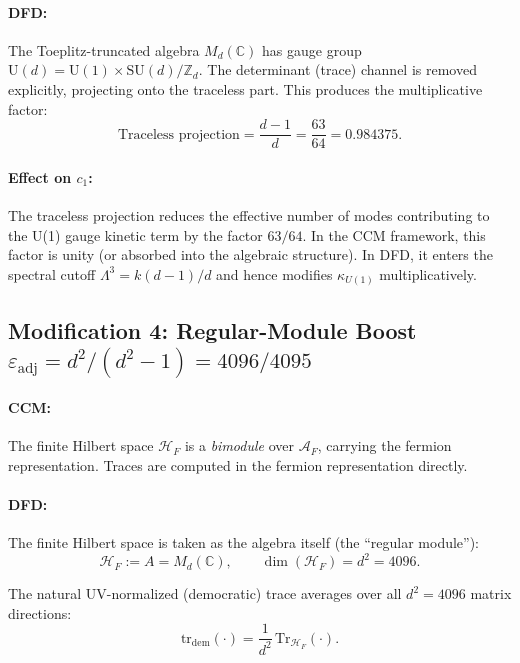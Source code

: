 \documentclass[12pt,a4paper]{article}
\begin{document}
\paragraph{DFD:} The Toeplitz-truncated algebra $M_d(\mathbb{C})$ has gauge
group $\mathrm{U}(d) = \mathrm{U}(1) \times \mathrm{SU}(d)/\mathbb{Z}_d$.
The determinant (trace) channel is removed explicitly, projecting onto the
traceless part.  This produces the multiplicative factor:
\begin{equation}
\boxed{\text{Traceless projection} = \frac{d-1}{d} = \frac{63}{64} = 0.984375.}
\end{equation}

\paragraph{Effect on $c_1$:}
The traceless projection reduces the effective number of modes contributing
to the U(1) gauge kinetic term by the factor $63/64$.  In the CCM framework,
this factor is unity (or absorbed into the algebraic structure).  In DFD, it
enters the spectral cutoff $\Lambda^3 = k(d-1)/d$ and hence modifies
$\kappa_{U(1)}$ multiplicatively.

\subsection{Modification 4: Regular-Module Boost
$\varepsilon_{\mathrm{adj}} = d^2/(d^2-1) = 4096/4095$}
\label{sec:mod-boost}

\paragraph{CCM:} The finite Hilbert space $\mathcal{H}_F$ is a
\emph{bimodule} over $\mathcal{A}_F$, carrying the fermion representation.
Traces are computed in the fermion representation directly.

\paragraph{DFD:} The finite Hilbert space is taken as the algebra itself
(the ``regular module''):
\begin{equation}
\mathcal{H}_F := A = M_d(\mathbb{C}), \qquad \dim(\mathcal{H}_F) = d^2 = 4096.
\end{equation}

The natural UV-normalized (democratic) trace averages over all $d^2 = 4096$
matrix directions:
\begin{equation}
\mathrm{tr}_{\mathrm{dem}}(\cdot) = \frac{1}{d^2}\,\mathrm{Tr}_{\mathcal{H}_F}(\cdot).
\end{equation}
\end{document}
